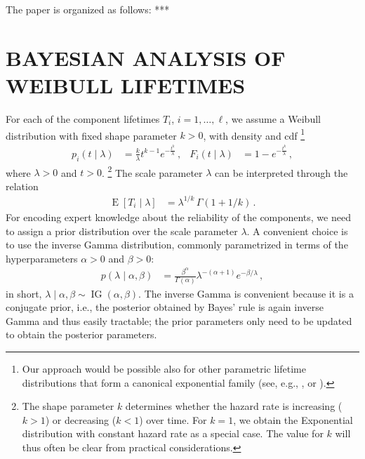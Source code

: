\documentclass[12pt,a4paper,twocolumn,fleqn]{narms}
\newcommand{\E}{\operatorname{E}}
\newcommand{\ig}{\operatorname{IG}}   %
\begin{document}
The paper is organized as follows: *** 


\section{BAYESIAN ANALYSIS OF WEIBULL LIFETIMES}
\label{sec:weibull}

For each of the component lifetimes $T_i$, $i=1,\ldots,\ell$,
we assume a Weibull distribution with fixed shape parameter $k > 0$, with density and cdf%
\footnote{Our approach would be possible also for other parametric lifetime distributions
that form a canonical exponential family
(see, e.g., , or ).}
\begin{align}
p_i(t \mid \lambda) &= \frac{k}{\lambda} t^{k-1} e^{-\frac{t^k}{\lambda}}\,, 
&
F_i(t \mid \lambda) &= 1 - e^{-\frac{t^k}{\lambda}} \,,
\end{align}
where $\lambda > 0$ and $t > 0$.%
\footnote{The shape parameter $k$ determines whether the hazard rate is increasing ($k > 1$)
or decreasing ($k < 1$) over time.
For $k=1$, we obtain the Exponential distribution with constant hazard rate as a special case.
The value for $k$ will thus often be clear from practical considerations.}
The scale parameter $\lambda$ can be interpreted through the relation
\begin{align}
\E[T_i \mid \lambda] &= \lambda^{1/k}\, \Gamma(1 + 1/k)\,.
\label{eq:lambdainterpret}
\end{align}
For encoding expert knowledge about the reliability of the components,
we need to assign a prior distribution over the scale parameter $\lambda$.
A convenient choice is to use the inverse Gamma distribution,
commonly parametrized in terms of the hyperparameters $\alpha > 0$ and $\beta > 0$:
\begin{align}
p(\lambda \mid \alpha, \beta) &= \frac{\beta^\alpha}{\Gamma(\alpha)} \lambda^{-(\alpha + 1)} e^{-\beta/\lambda} \,,
\end{align}
in short, $\lambda \mid \alpha, \beta \sim \ig(\alpha, \beta)$.
The inverse Gamma is convenient because it is a conjugate prior,
i.e., the posterior obtained by Bayes' rule is again inverse Gamma and thus easily tractable;
the prior parameters only need to be updated to obtain the posterior parameters.
\end{document}
